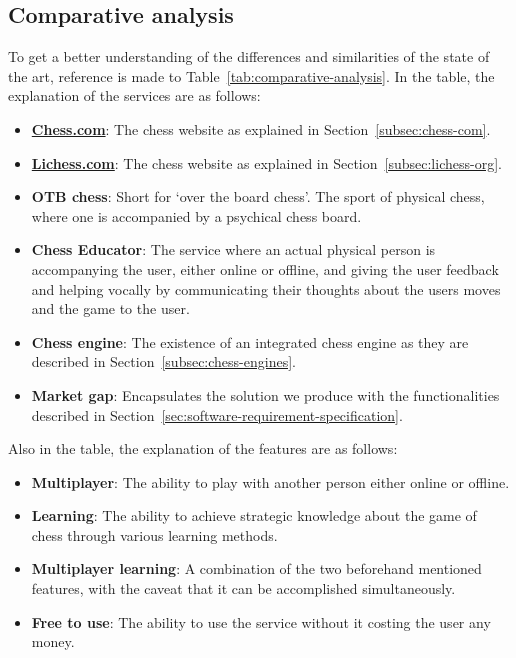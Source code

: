 \subsection{Comparative analysis}\label{subsec:comparative-analysis}

To get a better understanding of the differences and similarities of the state of the art, reference is made to
Table~\ref{tab:comparative-analysis}.
In the table, the explanation of the services are as follows:

\begin{itemize}
    \item \textbf{\url{Chess.com}}: The chess website as explained in Section~\ref{subsec:chess-com}.
    \item \textbf{\url{Lichess.com}}: The chess website as explained in Section~\ref{subsec:lichess-org}.
    \item \textbf{OTB chess}: Short for `over the board chess'.
    The sport of physical chess, where one is accompanied by a psychical chess board.
    \item \textbf{Chess Educator}: The service where an actual physical person is accompanying the user, either online
    or offline, and giving the user feedback and helping vocally by communicating their thoughts about the users moves
    and the game to the user.
    \item \textbf{Chess engine}: The existence of an integrated chess engine as they are described in
    Section~\ref{subsec:chess-engines}.
    \item \textbf{Market gap}: Encapsulates the solution we produce with the functionalities described in
    Section~\ref{sec:software-requirement-specification}.
\end{itemize}

Also in the table, the explanation of the features are as follows:

\begin{itemize}
    \item \textbf{Multiplayer}: The ability to play with another person either online or offline.
    \item \textbf{Learning}: The ability to achieve strategic knowledge about the game of chess through various learning
    methods.
    \item \textbf{Multiplayer learning}: A combination of the two beforehand mentioned features, with the caveat that it
    can be accomplished simultaneously.
    \item \textbf{Free to use}: The ability to use the service without it costing the user any money.
\end{itemize}

